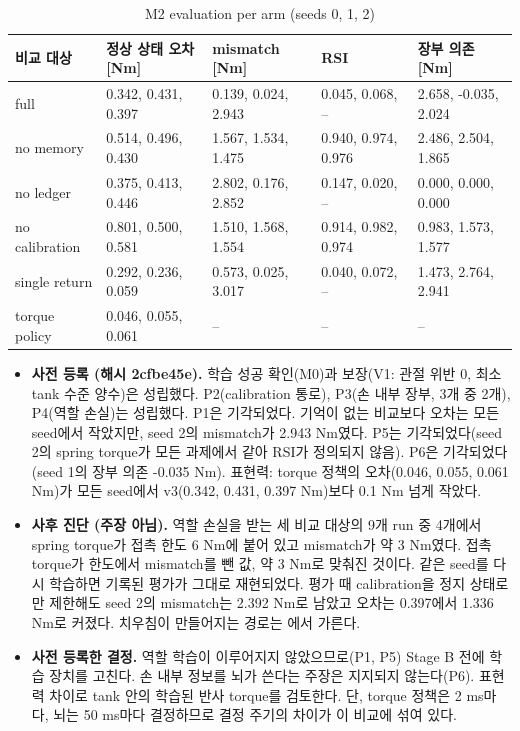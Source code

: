 \documentclass[11pt]{article}\usepackage[margin=1in]{geometry}\usepackage{amsmath,amssymb,amsthm,mathtools}\usepackage{graphicx}\graphicspath{{figures/}{../figures/}{figs/}{./}}\usepackage{enumitem}\usepackage{hyperref}\usepackage{cleveref}\usepackage{tikz}\usetikzlibrary{arrows.meta,positioning,calc,shapes.geometric}\usepackage{float}\usepackage{rotating}\usepackage[most]{tcolorbox}\usepackage{kotex}\usepackage{booktabs}\usepackage{longtable}\emergencystretch=1.6em\tolerance=2000 \crefname{assumption}{Assumption}{Assumptions}\Crefname{assumption}{Assumption}{Assumptions}\crefname{definition}{Definition}{Definitions}\Crefname{definition}{Definition}{Definitions}\crefname{proposition}{Proposition}{Propositions}\Crefname{proposition}{Proposition}{Propositions}\crefname{fact}{Fact}{Facts}\Crefname{fact}{Fact}{Facts} \newtheorem{assumption}{Assumption}\newtheorem{definition}{Definition}\newtheorem{lemma}{Lemma}\newtheorem{proposition}{Proposition}\newtheorem{theorem}{Theorem}\newtheorem{corollary}{Corollary}\newtheorem{fact}{Fact}\theoremstyle{remark}\newtheorem{remark}{Remark} \newcommand{\R}{\mathbb{R}}\newcommand{\xb}{\bar x}\newcommand{\Ab}{\bar A}\newcommand{\By}{\bar B_y}\newcommand{\U}{\mathcal U}\newcommand{\Z}{\mathcal Z}
\begin{document}
\begin{table}[H]
\centering\footnotesize
\caption{M2 evaluation per arm (seeds 0, 1, 2)}
\label{tab:m2}
\begin{tabular}{lllll}
\toprule
비교 대상 & 정상 상태 오차 [Nm] & mismatch [Nm] & RSI & 장부 의존 [Nm] \\
\midrule
full & 0.342, 0.431, 0.397 & 0.139, 0.024, 2.943 & 0.045, 0.068, -- & 2.658, -0.035, 2.024 \\
no memory & 0.514, 0.496, 0.430 & 1.567, 1.534, 1.475 & 0.940, 0.974, 0.976 & 2.486, 2.504, 1.865 \\
no ledger & 0.375, 0.413, 0.446 & 2.802, 0.176, 2.852 & 0.147, 0.020, -- & 0.000, 0.000, 0.000 \\
no calibration & 0.801, 0.500, 0.581 & 1.510, 1.568, 1.554 & 0.914, 0.982, 0.974 & 0.983, 1.573, 1.577 \\
single return & 0.292, 0.236, 0.059 & 0.573, 0.025, 3.017 & 0.040, 0.072, -- & 1.473, 2.764, 2.941 \\
torque policy & 0.046, 0.055, 0.061 & -- & -- & -- \\
\bottomrule
\end{tabular}
\end{table}

\begin{itemize}
\item \textbf{사전 등록 (해시 2cfbe45e).} 학습 성공 확인(M0)과 보장(V1: 관절 위반 0, 최소 tank 수준 양수)은 성립했다. P2(calibration 통로), P3(손 내부 장부, 3개 중 2개), P4(역할 손실)는 성립했다. P1은 기각되었다. 기억이 없는 비교보다 오차는 모든 seed에서 작았지만, seed 2의 mismatch가 2.943 Nm였다. P5는 기각되었다(seed 2의 spring torque가 모든 과제에서 같아 RSI가 정의되지 않음). P6은 기각되었다(seed 1의 장부 의존 -0.035 Nm). 표현력: torque 정책의 오차(0.046, 0.055, 0.061 Nm)가 모든 seed에서 v3(0.342, 0.431, 0.397 Nm)보다 0.1 Nm 넘게 작았다.
\item \textbf{사후 진단 (주장 아님).} 역할 손실을 받는 세 비교 대상의 9개 run 중 4개에서 spring torque가 접촉 한도 6 Nm에 붙어 있고 mismatch가 약 3 Nm였다. 접촉 torque가 한도에서 mismatch를 뺀 값, 약 3 Nm로 맞춰진 것이다. 같은 seed를 다시 학습하면 기록된 평가가 그대로 재현되었다. 평가 때 calibration을 정지 상태로만 제한해도 seed 2의 mismatch는 2.392 Nm로 남았고 오차는 0.397에서 1.336 Nm로 커졌다. 치우침이 만들어지는 경로는 에서 가른다.
\item \textbf{사전 등록한 결정.} 역할 학습이 이루어지지 않았으므로(P1, P5) Stage B 전에 학습 장치를 고친다. 손 내부 정보를 뇌가 쓴다는 주장은 지지되지 않는다(P6). 표현력 차이로 tank 안의 학습된 반사 torque를 검토한다. 단, torque 정책은 2 ms마다, 뇌는 50 ms마다 결정하므로 결정 주기의 차이가 이 비교에 섞여 있다.
\end{itemize}
\end{document}
